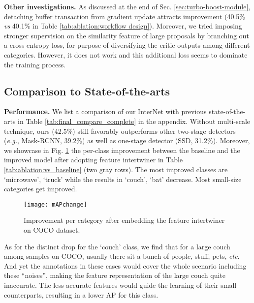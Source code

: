 \documentclass{article} \usepackage{iclr2019_conference,times}
\begin{document}
\textbf{Other investigations.} As discussed at the end of Sec. \ref{sec:turbo-boost-module}, detaching buffer transaction from gradient update attracts improvement (40.5\% \textit{vs} 40.1\% in Table \ref{tab:ablation:workflow design}). Moreover, we  tried imposing stronger supervision on the similarity feature of large proposals by branching out a cross-entropy loss, for purpose of diversifying the critic outputs among different categories. However, it does not work and this additional loss seems to dominate the training process. 



\subsection{Comparison to State-of-the-arts}

\textbf{Performance.} We list a comparison of our InterNet with previous state-of-the-arts in Table \ref{tab:final_compare_complete} in the appendix. Without multi-scale technique, ours (42.5\%) still favorably outperforms other two-stage detectors (\textit{e.g.}, Mask-RCNN, 39.2\%) as well as one-stage detector (SSD, 31.2\%).
Moreover, we showcase in Fig. \ref{fig:improve_per_class} the per-class improvement between the baseline and the improved model 
after adopting feature intertwiner in Table \ref{tab:ablation:vs_baseline} (two gray rows). The most improved classes are ‘microwave’, ‘truck’ while the results in ‘couch’, ‘bat’ decrease. Most small-size categories get improved.
\begin{figure}[h]
	\centering
		\texttt{[image: mAPchange]}
\vspace{-.2cm}
		\caption{
			Improvement per category after embedding the feature intertwiner on COCO dataset.
		} \label{fig:improve_per_class}
\end{figure}
{
As for the distinct drop for the `couch' class, we find that for a large couch among samples on COCO, usually there sit a bunch of people, stuff, pets, \textit{etc}. And yet the annotations in these cases would cover the whole scenario including these “noises”, making the feature representation of the large couch quite inaccurate. The less accurate features would guide the learning of their small counterparts, resulting in a lower AP for this class.} 
\end{document}
